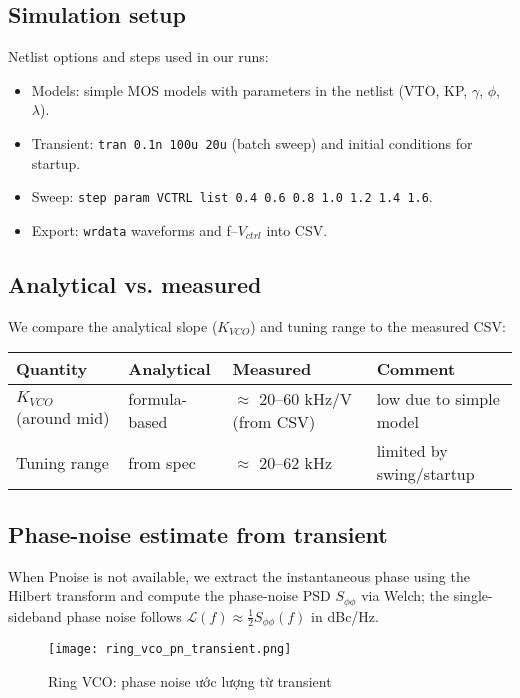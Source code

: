 \subsection*{Simulation setup}
Netlist options and steps used in our runs:
\begin{itemize}
  \item Models: simple MOS models with parameters in the netlist (VTO, KP, $\gamma$, $\phi$, $\lambda$).
  \item Transient: \texttt{tran 0.1n 100u 20u} (batch sweep) and initial conditions for startup.
  \item Sweep: \texttt{step param VCTRL list 0.4 0.6 0.8 1.0 1.2 1.4 1.6}.
  \item Export: \texttt{wrdata} waveforms and f--$V_{ctrl}$ into CSV.
\end{itemize}

\subsection*{Analytical vs. measured}
We compare the analytical slope ($K_{VCO}$) and tuning range to the measured CSV:
\begin{table}[H]
  \centering
  \begin{tabular}{llll}
    \toprule
    Quantity & Analytical & Measured & Comment \\
    \midrule
    $K_{VCO}$ (around mid) & formula-based & $\approx$ 20–60 kHz/V (from CSV) & low due to simple model \\
    Tuning range & from spec & $\approx$ 20–62 kHz & limited by swing/startup \\
    \bottomrule
  \end{tabular}
\end{table}

\subsection*{Phase-noise estimate from transient}
When Pnoise is not available, we extract the instantaneous phase using the Hilbert transform and compute the phase-noise PSD \(S_{\phi\phi}\) via Welch; the single-sideband phase noise follows \(\mathcal{L}(f) \approx \tfrac{1}{2}S_{\phi\phi}(f)\) in dBc/Hz.

\begin{figure}[H]
  \centering
  \texttt{[image: ring\_vco\_pn\_transient.png]}
  \caption{Ring VCO: phase noise ước lượng từ transient}
\end{figure}

